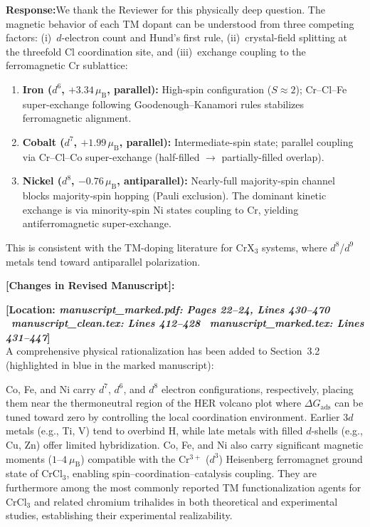 \documentclass[11pt, sans, a4paper]{moderncv}
\newcommand{\response}{\vspace{0.4em}\noindent\textbf{\color{actionblue}Response:}\hspace{0.5em}}
\newcommand{\manuscriptchange}[1]{\vspace{0.4em}\noindent\textbf{\color{acsblue}[Changes in Revised Manuscript]:}\par\nopagebreak\vspace{0.15em}#1\vspace{0.4em}}
\begin{document}
\response We thank the Reviewer for this physically deep question. The magnetic behavior of each TM dopant can be understood from three competing factors: (i)~$d$-electron count and Hund's first rule, (ii)~crystal-field splitting at the threefold Cl coordination site, and (iii)~exchange coupling to the ferromagnetic Cr sublattice:
\begin{enumerate}[leftmargin=1.5em, itemsep=0.2em]
\item \textbf{Iron ($d^6$, $+3.34\,\mu_{\mathrm{B}}$, parallel):} High-spin configuration ($S \approx 2$); Cr--Cl--Fe super-exchange following Goodenough--Kanamori rules stabilizes ferromagnetic alignment.
\item \textbf{Cobalt ($d^7$, $+1.99\,\mu_{\mathrm{B}}$, parallel):} Intermediate-spin state; parallel coupling via Cr--Cl--Co super-exchange (half-filled $\to$ partially-filled overlap).
\item \textbf{Nickel ($d^8$, $-0.76\,\mu_{\mathrm{B}}$, antiparallel):} Nearly-full majority-spin channel blocks majority-spin hopping (Pauli exclusion). The dominant kinetic exchange is via minority-spin Ni states coupling to Cr, yielding antiferromagnetic super-exchange.
\end{enumerate}
This is consistent with the TM-doping literature for CrX$_3$ systems, where $d^8$/$d^9$ metals tend toward antiparallel polarization.

\manuscriptchange{\textbf{[Location: \textit{manuscript\_marked.pdf: Pages 22--24, Lines 430--470} \textbar\ \textit{manuscript\_clean.tex: Lines 412--428} \textbar\ \textit{manuscript\_marked.tex: Lines 431--447}]}\\ A comprehensive physical rationalization has been added to Section~3.2 (highlighted in blue in the marked manuscript):}
\begin{addedtext}
Co, Fe, and Ni carry $d^7$, $d^6$, and $d^8$ electron configurations, respectively, placing them near the thermoneutral region of the HER volcano plot where $\Delta G_{\mathrm{ads}}$ can be tuned toward zero by controlling the local coordination environment. Earlier $3d$ metals (e.g., Ti, V) tend to overbind H, while late metals with filled $d$-shells (e.g., Cu, Zn) offer limited hybridization. Co, Fe, and Ni also carry significant magnetic moments ($1$--$4~\mu_{\mathrm{B}}$) compatible with the Cr$^{3+}$ ($d^3$) Heisenberg ferromagnet ground state of CrCl$_3$, enabling spin--coordination--catalysis coupling. They are furthermore among the most commonly reported TM functionalization agents for CrCl$_3$ and related chromium trihalides in both theoretical and experimental studies, establishing their experimental realizability.
\end{addedtext}
\end{document}
